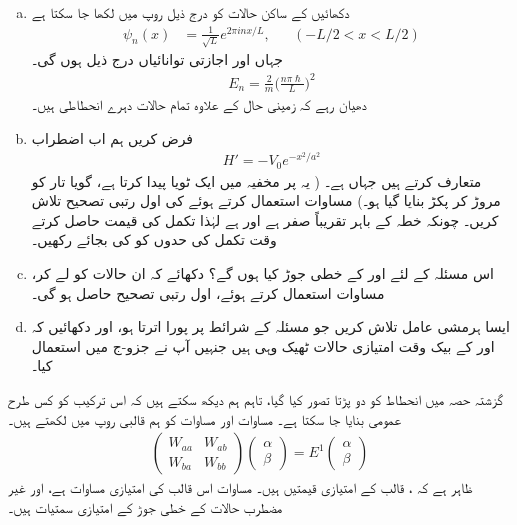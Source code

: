 \begin{enumerate}[a.]
\item
دکھائیں کے ساکن حالات کو درج ذیل روپ میں لکھا جا سکتا ہے 
 \begin{align*}
\psi_n (x) &= \frac{1}{\sqrt{L}} e^{2 \pi i n x/ L}, &&(-L/2 < x < L/2)
\end{align*}
جہاں  اور اجازتی توانائیاں درج ذیل ہوں گی۔
\begin{align*}
E_n = \frac{2}{m} \big ( \frac{n \pi \hslash}{L} \big )^2
\end{align*}
دھیان رہے کہ زمینی حال  کے علاوہ تمام حالات دہرے انحطاطی ہیں۔ 
\item
فرض کریں ہم اب اضطراب 
\begin{align*}
H' = -V_0 e^{-x^2 / a^2}
\end{align*}
متعارف کرتے ہیں جہاں  ہے۔ ( یہ  پر مخفیہ میں ایک ٹویا پیدا کرتا ہے، گویا تار کو مروڑ کر پکڑ بنایا گیا ہو۔) مساوات  استعمال کرتے ہوئے  کی اول رتبی تصحیح تلاش کریں۔  چونکہ  خطہ  کے باہر تقریباً صفر ہے اور  ہے لہٰذا تکمل کی قیمت حاصل کرتے وقت تکمل کی حدوں کو  کی بجائے  رکھیں۔
\item
اس مسئلہ کے لئے  اور  کے  خطی جوڑ کیا ہوں گے؟ دکھائے کہ ان حالات کو لے کر، مساوات  استعمال کرتے ہوئے، اول رتبی تصحیح حاصل ہو گی۔ 
\item
ایسا ہرمشی عامل  تلاش کریں جو مسئلہ کے شرائط پر پورا اترتا ہو، اور دکھائیں کہ  اور  کے بیک وقت امتیازی حالات ٹھیک وہی ہیں جنہیں آپ نے جزو-ج میں استعمال کیا۔
\end{enumerate}


گزشتہ حصہ میں انحطاط کو دو پڑتا تصور کیا گیا، تاہم ہم دیکھ سکتے ہیں کہ اس ترکیب کو کس طرح عمومی بنایا جا سکتا ہے۔ مساوات  اور مساوات  کو ہم قالبی روپ میں لکھتے ہیں۔ 
\begin{align}
\begin{pmatrix} 
W_{aa} & W_{ab} \\
W_{ba} & W_{bb}
\end{pmatrix}
\begin{pmatrix}
\alpha \\
\beta
\end{pmatrix}
= E^1
\begin{pmatrix}
\alpha \\
\beta
\end{pmatrix}
\end{align}
ظاہر ہے کہ  ، قالب کے امتیازی قیمتیں ہیں۔ مساوات  اس قالب کی امتیازی مساوات ہے، اور غیر مضطرب حالات کے  خطی جوڑ  کے امتیازی سمتیات ہیں۔


